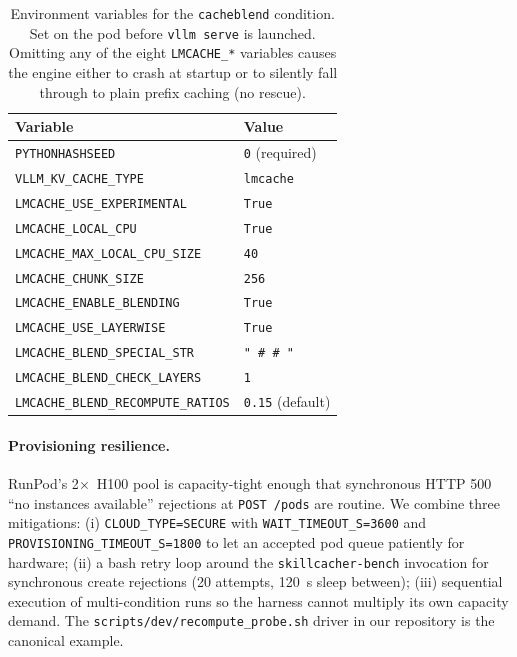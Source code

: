 \begin{table}[t]
\small
\centering
\begin{tabular}{ll}
\toprule
Variable & Value \\
\midrule
\texttt{PYTHONHASHSEED} & \texttt{0} (required) \\
\texttt{VLLM\_KV\_CACHE\_TYPE} & \texttt{lmcache} \\
\texttt{LMCACHE\_USE\_EXPERIMENTAL} & \texttt{True} \\
\texttt{LMCACHE\_LOCAL\_CPU} & \texttt{True} \\
\texttt{LMCACHE\_MAX\_LOCAL\_CPU\_SIZE} & \texttt{40} \\
\texttt{LMCACHE\_CHUNK\_SIZE} & \texttt{256} \\
\texttt{LMCACHE\_ENABLE\_BLENDING} & \texttt{True} \\
\texttt{LMCACHE\_USE\_LAYERWISE} & \texttt{True} \\
\texttt{LMCACHE\_BLEND\_SPECIAL\_STR} & \texttt{" \# \# "} \\
\texttt{LMCACHE\_BLEND\_CHECK\_LAYERS} & \texttt{1} \\
\texttt{LMCACHE\_BLEND\_RECOMPUTE\_RATIOS} & \texttt{0.15} (default) \\
\bottomrule
\end{tabular}
\caption{Environment variables for the \texttt{cacheblend} condition.
Set on the pod before \texttt{vllm serve} is launched. Omitting any
of the eight \texttt{LMCACHE\_*} variables causes the engine either
to crash at startup or to silently fall through to plain prefix
caching (no rescue).}
\label{tab:repro-env}
\end{table}

\paragraph{Provisioning resilience.} RunPod's 2$\times$~H100 pool is
capacity-tight enough that synchronous HTTP 500 ``no instances
available'' rejections at \texttt{POST /pods} are routine. We
combine three mitigations: (i) \texttt{CLOUD\_TYPE=SECURE} with
\texttt{WAIT\_TIMEOUT\_S=3600} and
\texttt{PROVISIONING\_TIMEOUT\_S=1800} to let an accepted pod queue
patiently for hardware; (ii) a bash retry loop around the
\texttt{skillcacher-bench} invocation for synchronous create
rejections (20 attempts, 120~s sleep between); (iii) sequential
execution of multi-condition runs so the harness cannot multiply
its own capacity demand. The
\texttt{scripts/dev/recompute\_probe.sh} driver in our repository is
the canonical example.

